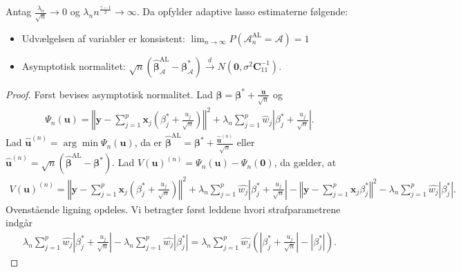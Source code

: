 \begin{thm}\label{thm:ALoracle}
Antag $\frac{\lambda_n}{\sqrt{n}} \rightarrow 0$ og $\lambda_n n^\frac{\gamma-1}{2} \rightarrow \infty$. Da opfylder adaptive lasso estimaterne følgende:
\begin{itemize}
\item Udvælgelsen af variabler er konsistent: $\lim_{n \rightarrow \infty} P(\mathcal{A}_n^\text{AL}=\mathcal{A})=1$
\item Asymptotisk normalitet: $\sqrt{n}\left( \hat{\boldsymbol{\beta}}_\mathcal{A}^{\text{AL}}-\boldsymbol{\beta}_\mathcal{A}^* \right) \overset{d}{\rightarrow} N(\textbf{0},\sigma^2 \boldsymbol{C}_{11}^{-1}).$
\end{itemize} 
\end{thm}
\begin{proof}
Først bevises asymptotisk normalitet. Lad $\boldsymbol{\beta}=\boldsymbol{\beta}^{*} +\frac{\textbf{u}}{\sqrt{n}}$ og
\begin{align*}
\Psi_n(\textbf{u})=\left\Vert \mathbf{y}-\sum_{j=1}^p \textbf{x}_j \left( \beta_j^{*} +\frac{u_j}{\sqrt{n}} \right) \right\Vert^2 + \lambda_n \sum_{j=1}^p \hat{w}_j \left\vert \beta_j^{*} + \frac{u_j}{\sqrt{n}} \right\vert.
\end{align*}
Lad $\hat{\textbf{u}}^{(n)}=\arg \min \Psi_n(\textbf{u})$, da er $\hat{\boldsymbol{\beta}}^{{\text{AL}}}=\boldsymbol{\beta}^{*} + \frac{\hat{\boldsymbol{u}}^{(n)}}{\sqrt{n}}$ eller $\hat{\boldsymbol{u}}^{(n)}=\sqrt{n}\left(\hat{\boldsymbol{\beta}}^{\text{AL}}-\boldsymbol{\beta}^{*}\right)$.
Lad $V(\mathbf{u})^{(n)}=\Psi_n(\textbf{u}) - \Psi_n(\textbf{0})$, da gælder, at
\begin{align*}
V(\mathbf{u})^{(n)}= \left\Vert \textbf{y} - \sum_{j=1}^p \textbf{x}_j \left( \beta_j^{*} + \frac{u_j}{\sqrt{n}} \right) \right\Vert^2 +
\lambda_n \sum_{j=1}^p \hat{w_j} \left\vert \beta_j^{*} + \frac{u_j}{\sqrt{n}} \right\vert 
-
\left\Vert \textbf{y} - \sum_{j=1}^p \textbf{x}_j \beta_j^{*} \right\Vert^2 - \lambda_n \sum_{j=1}^p \hat{w_j} \left\vert \beta_j^{*} \right\vert.
\end{align*}
Ovenstående ligning opdeles.
Vi betragter først leddene hvori strafparametrene indgår
\begin{align*}
\lambda_n \sum_{j=1}^p \hat{w_j} \left\vert \beta_j^{*} + \frac{u_j}{\sqrt{n}} \right\vert- \lambda_n \sum_{j=1}^p \hat{w_j} \left\vert \beta_j^{*} \right\vert 
= \lambda_n \sum_{j=1}^p \hat{w_j} \left( \left\vert \beta_j^{*} + \frac{u_j}{\sqrt{n}} \right\vert - \left\vert \beta_j^{*} \right\vert
\right).

\end{align*}
\end{proof}
